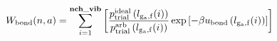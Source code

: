 \documentclass[12pt]{article}
\begin{document}
\begin{displaymath}
W_{\rm bond}(n,a) 
= 
\sum_{i=1}^{\bf nch\_vib}
{
\left[
{{p_{\rm trial}^{\rm ideal}\left(l_{\rm g_a,f}(i)\right)}\over{ p_{\rm trial}^{\rm arb}\left(l_{\rm g_a,f}(i)\right)}}
\exp\left[-\beta u_{\rm bond}\left(l_{\rm g_a,f}(i)\right)\right]
\right]
}
\end{displaymath}
\end{document}
